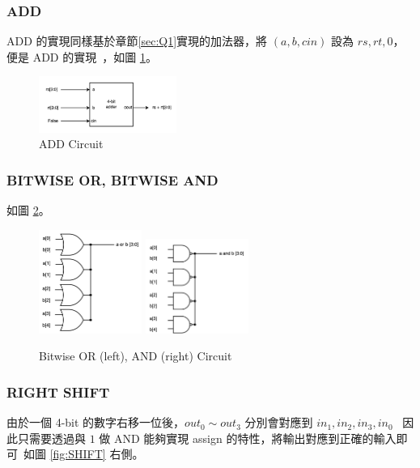 \documentclass[10.5pt,compsoc,UTF8]{CjC}
\theoremstyle{mystyle}
\begin{document}
\subsubsection*{ADD}
ADD 的實現同樣基於章節\ref{sec:Q1}實現的加法器，將 $(a, b, cin)$ 設為 $rs, rt, 0$，便是 ADD 的實現\
，如圖 \ref{fig:ADD}。

\begin{figure}[htp]
  \centering
  \includegraphics[width=0.4\textwidth]{ADD.png}
  \caption{ADD Circuit}
  \label{fig:ADD}
\end{figure}

\newpage

\subsubsection*{BITWISE OR, BITWISE AND}
如圖 \ref{fig:OR-AND}。

\begin{figure}[htp]
  \centering
  \includegraphics[width=0.3\textwidth]{BITOR.png}
  \includegraphics[width=0.3\textwidth]{BITAND.png}
  \caption{Bitwise OR (left), AND (right) Circuit}
  \label{fig:OR-AND}
\end{figure}

\subsubsection*{RIGHT SHIFT}
由於一個 4-bit 的數字右移一位後，$out_0 \sim out_3$ 分別會對應到 $in_1, in_2, in_3, in_0$ \
因此只需要透過與 $1$ 做 AND 能夠實現 assign 的特性，將輸出對應到正確的輸入即可\
如圖 \ref{fig:SHIFT} 右側。
\end{document}
